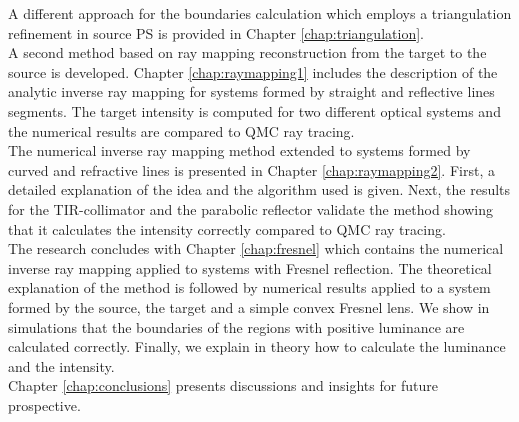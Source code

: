 A different approach for the boundaries calculation which employs a triangulation refinement in source PS is provided in Chapter \ref{chap:triangulation}.  
\\ \indent A second method based on ray mapping reconstruction from the target to the source is developed. Chapter \ref{chap:raymapping1} includes the description of the analytic inverse ray mapping for systems formed by straight and reflective lines segments. The target intensity is computed for two different optical systems and the numerical results are compared to QMC ray tracing. \\ \indent The numerical inverse ray mapping method extended to systems formed by curved and refractive lines is presented in
Chapter \ref{chap:raymapping2}. First, a detailed explanation of the idea and the algorithm used is given. Next, the results for the TIR-collimator and the parabolic reflector validate the method showing that it calculates the intensity correctly compared to QMC ray tracing. \\ \indent
The research concludes with Chapter \ref{chap:fresnel} which contains the numerical inverse ray mapping applied to systems with Fresnel reflection. The theoretical explanation of the method is followed by numerical results applied to a system formed by the source, the target and a simple convex Fresnel lens. We show in simulations that the boundaries of the regions with positive luminance are calculated correctly. Finally, we explain in theory how to calculate the luminance and the intensity.
 \\ \indent Chapter \ref{chap:conclusions} presents discussions and insights for future prospective.
\clearpage{\pagestyle{empty}\cleardoublepage}
 